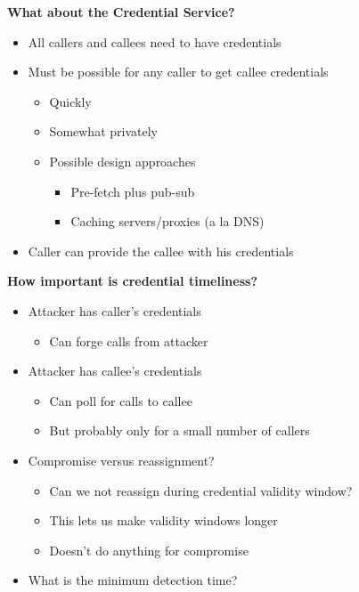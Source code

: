 \documentclass[helvetica]{seminar}
\newcommand{\heading}[1]{%
  \begin{center} 
    \large\bf 
    #1 
  \end{center} 
  \vspace{.4 in}}
\begin{document}
\begin{slide}
\heading{What about the Credential Service?}

\begin{itemize}
\item All callers and callees need to have credentials
\item Must be possible for any caller to get callee credentials
  \begin{itemize}
  \item Quickly
  \item Somewhat privately
  \item Possible design approaches
    \begin{itemize}
    \item Pre-fetch plus pub-sub
    \item Caching servers/proxies (a la DNS)
    \end{itemize}
  \end{itemize}
\item Caller can provide the callee with his credentials
\end{itemize}
\end{slide}


\begin{slide}
\heading{How important is credential timeliness?}

\begin{itemize}
\item Attacker has caller's credentials
  \begin{itemize}
  \item Can forge calls from attacker
  \end{itemize}

\item Attacker has callee's credentials
  \begin{itemize}
  \item Can poll for calls to callee
  \item But probably only for a small number of callers
  \end{itemize}

\item Compromise versus reassignment?
  \begin{itemize}
  \item Can we not reassign during credential validity window?
  \item This lets us make validity windows longer
  \item Doesn't do anything for compromise
  \end{itemize}

\item What is the minimum detection time?
\end{itemize}
\end{slide}
\end{document}
